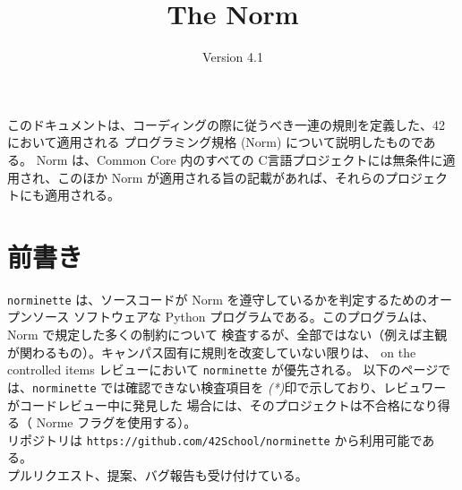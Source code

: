 \documentclass{42-ja}
\begin{document}
\title{The Norm}
\subtitle{Version 4.1}

\summary
{
    このドキュメントは、コーディングの際に従うべき一連の規則を定義した、42 において適用される
      プログラミング規格 (Norm) について説明したものである。
    Norm は、Common Core 内のすべての C言語プロジェクトには無条件に適用され、このほか Norm 
      が適用される旨の記載があれば、それらのプロジェクトにも適用される。
}

\maketitle

\tableofcontents



\chapter{前書き}

\texttt{norminette} は、ソースコードが Norm を遵守しているかを判定するためのオープンソース
  ソフトウェアな Python プログラムである。このプログラムは、Norm で規定した多くの制約について
  検査するが、全部ではない（例えば主観が関わるもの）。キャンパス固有に規則を改変していない限りは、
  on the controlled items
  レビューにおいて \texttt{norminette} が優先される。 以下のページでは、\texttt{norminette}
  では確認できない検査項目を \textit{(*)}印で示しており、レビュワーがコードレビュー中に発見した
  場合には、そのプロジェクトは不合格になり得る（ Norme フラグを使用する）。\\

リポジトリは \texttt{https://github.com/42School/norminette} から利用可能である。\\

プルリクエスト、提案、バグ報告も受け付けている。

\newpage


%
%
\end{document}
